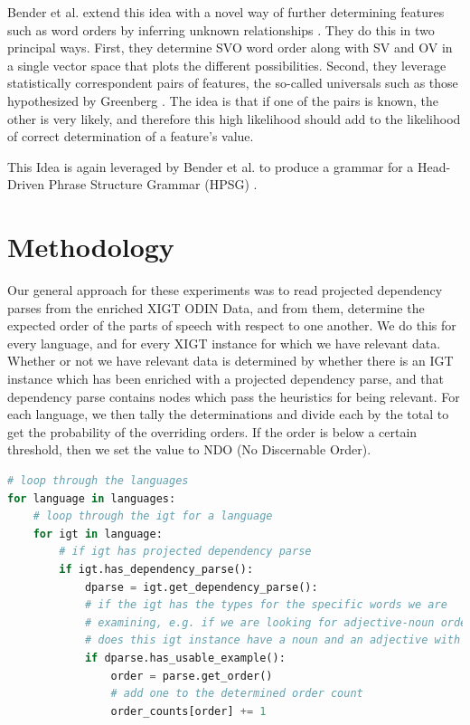 \documentclass[]{article}
\begin{document}
Bender et al. extend this idea with a novel way of further determining features such as word orders by inferring unknown relationships \cite{goodman2013towards}.  They do this in two principal ways.  First, they determine SVO word order along with SV and OV in a single vector space that plots the different possibilities.  Second, they leverage statistically correspondent pairs of features, the so-called universals such as those hypothesized by Greenberg \cite{greenberg1963some}.  The idea is that if one of the pairs is known, the other is very likely, and therefore this high likelihood should add to the likelihood of correct determination of a feature's value.  \par

This Idea is again leveraged by Bender et al. \cite{bender2014learning} to produce a grammar for a Head-Driven Phrase Structure Grammar (HPSG) \cite{pollard1994head}. \par


\section{Methodology}
Our general approach for these experiments was to read projected dependency parses from the enriched XIGT ODIN Data, and from them, determine the expected order of the parts of speech with respect to one another.  We do this for every language, and for every XIGT instance for which we have relevant data.  Whether or not we have relevant data is determined by whether there is an IGT instance which has been enriched with a projected dependency parse, and that dependency parse contains nodes which pass the heuristics for being relevant.  For each language, we then tally the determinations and divide each by the total to get the probability of the overriding orders.  If the order is below a certain threshold, then we set the value to NDO (No Discernable Order).

\begin{lstlisting}[language=python]
# loop through the languages
for language in languages:
    # loop through the igt for a language
    for igt in language:
        # if igt has projected dependency parse
        if igt.has_dependency_parse():
            dparse = igt.get_dependency_parse():
            # if the igt has the types for the specific words we are 
            # examining, e.g. if we are looking for adjective-noun order,
            # does this igt instance have a noun and an adjective with a head noun
            if dparse.has_usable_example():
                order = parse.get_order()
                # add one to the determined order count
                order_counts[order] += 1
                
\end{lstlisting}
\end{document}
